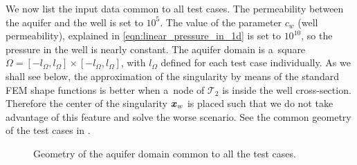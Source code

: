We now list the input data common to all test cases.
The permeability between the aquifer and the well is set to $10^5$.
The value of the parameter $c_w$ (well permeability), explained in \eqref{eqn:linear_pressure_in_1d} is set to $10^{10}$,
so the pressure in the well is nearly constant.
The aquifer domain is a~square $\Omega=[-l_\Omega, l_\Omega]\times[-l_\Omega,l_\Omega]$, with $l_
\Omega$ defined for each test case individually.
As we shall see below, the approximation of the singularity by means of the standard FEM shape functions is better 
when a~node of $\mathcal{T}_{2}$ is inside the well cross-section. Therefore the center of the singularity $\mathbf{\boldsymbol{x}}_w$
is placed such that we do not take advantage of this feature and solve the worse scenario.
See the common geometry of the test cases in .

\begin{figure}[!htb]
    \centering    
    \def\svgwidth{0.35\textwidth}
        
  \caption[Geometry of the single aquifer domain.]{Geometry of the aquifer domain common to all the test cases.}
  \label{fig:test_cases_geometry}
\end{figure}

